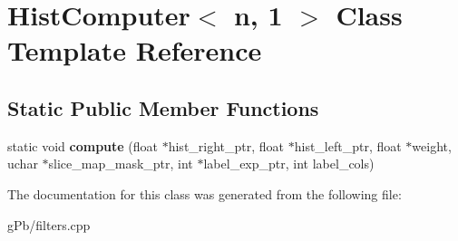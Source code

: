 \hypertarget{class_hist_computer_3_01n_00_011_01_4}{\section{Hist\-Computer$<$ n, 1 $>$ Class Template Reference}
\label{class_hist_computer_3_01n_00_011_01_4}
}
\subsection*{Static Public Member Functions}
\begin{DoxyCompactItemize}
\item 
\hypertarget{class_hist_computer_3_01n_00_011_01_4_a7640671799dd78428353948fe50beb60}{static void {\bfseries compute} (float $\ast$hist\-\_\-right\-\_\-ptr, float $\ast$hist\-\_\-left\-\_\-ptr, float $\ast$weight, uchar $\ast$slice\-\_\-map\-\_\-mask\-\_\-ptr, int $\ast$label\-\_\-exp\-\_\-ptr, int label\-\_\-cols)}\label{class_hist_computer_3_01n_00_011_01_4_a7640671799dd78428353948fe50beb60}

\end{DoxyCompactItemize}


The documentation for this class was generated from the following file\-:\begin{DoxyCompactItemize}
\item 
g\-Pb/filters.\-cpp\end{DoxyCompactItemize}
